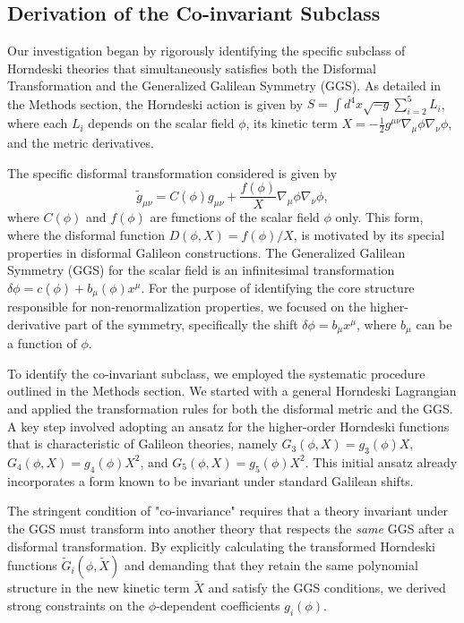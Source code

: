 \documentclass[twocolumn]{aastex631}
\begin{document}
\subsection{Derivation of the Co-invariant Subclass}
Our investigation began by rigorously identifying the specific subclass of Horndeski theories that simultaneously satisfies both the Disformal Transformation and the Generalized Galilean Symmetry (GGS). As detailed in the Methods section, the Horndeski action is given by $S = \int d^4x \sqrt{-g} \sum_{i=2}^{5} L_i$, where each $L_i$ depends on the scalar field $\phi$, its kinetic term $X = -\frac{1}{2}g^{\mu\nu}\nabla_\mu\phi\nabla_\nu\phi$, and the metric derivatives.

The specific disformal transformation considered is given by
\begin{equation}
    \tilde{g}_{\mu\nu} = C(\phi) g_{\mu\nu} + \frac{f(\phi)}{X} \nabla_\mu\phi \nabla_\nu\phi,
\end{equation}
where $C(\phi)$ and $f(\phi)$ are functions of the scalar field $\phi$ only. This form, where the disformal function $D(\phi, X) = f(\phi)/X$, is motivated by its special properties in disformal Galileon constructions. The Generalized Galilean Symmetry (GGS) for the scalar field is an infinitesimal transformation $\delta \phi = c(\phi) + b_\mu(\phi) x^\mu$. For the purpose of identifying the core structure responsible for non-renormalization properties, we focused on the higher-derivative part of the symmetry, specifically the shift $\delta \phi = b_\mu x^\mu$, where $b_\mu$ can be a function of $\phi$.

To identify the co-invariant subclass, we employed the systematic procedure outlined in the Methods section. We started with a general Horndeski Lagrangian and applied the transformation rules for both the disformal metric and the GGS. A key step involved adopting an ansatz for the higher-order Horndeski functions that is characteristic of Galileon theories, namely $G_3(\phi, X) = g_3(\phi) X$, $G_4(\phi, X) = g_4(\phi) X^2$, and $G_5(\phi, X) = g_5(\phi) X^2$. This initial ansatz already incorporates a form known to be invariant under standard Galilean shifts.

The stringent condition of "co-invariance" requires that a theory invariant under the GGS must transform into another theory that respects the \textit{same} GGS after a disformal transformation. By explicitly calculating the transformed Horndeski functions $\tilde{G}_i(\phi, \tilde{X})$ and demanding that they retain the same polynomial structure in the new kinetic term $\tilde{X}$ and satisfy the GGS conditions, we derived strong constraints on the $\phi$-dependent coefficients $g_i(\phi)$.
\end{document}
